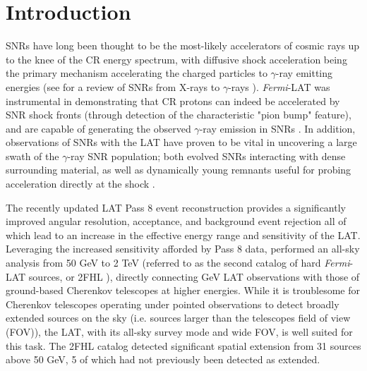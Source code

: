 \documentclass[iop]{emulateapj}
\newcommand{\kibitz}[2]{\ifnum\Comments=1\textcolor{#1}{#2}\fi}
\newcommand{\jamie}[1]{\kibitz{red}      {[JAM: #1]}}
\newcommand{\gam}{$\gamma$-ray}
\newcommand{\Fermi}{\emph{Fermi}}  %
\begin{document}
\section{Introduction}\label{G150:intro}
SNRs have long been thought to be the most-likely accelerators of cosmic rays up to the knee of the CR energy spectrum, with diffusive shock acceleration being the primary mechanism accelerating the charged particles to \gam{} emitting energies (see \cite{Reynolds08} for a review of  SNRs from X-rays to \gam{}s ). \Fermi{}-LAT was instrumental in demonstrating that CR protons can indeed be accelerated by SNR shock fronts (through detection of the characteristic "pion bump" feature), and are capable of generating the observed \gam{} emission in SNRs \citep{W44pion, Jogler16}. In addition, observations of SNRs with the LAT have proven to be vital in uncovering a large swath of the \gam{} SNR population; both evolved SNRs interacting with dense surrounding material, as well as dynamically young remnants useful for probing acceleration directly at the shock \citep{snrCat}. 

The  recently updated LAT Pass 8 event reconstruction provides a significantly improved angular resolution,  acceptance, and background event rejection \citep{atwood13b,atwood13} %
all of which lead to an increase in the effective energy range and sensitivity of the LAT. Leveraging the increased sensitivity afforded by Pass 8 data, \cite{2FHL} performed an all-sky analysis from 50 GeV to 2 TeV (referred to as the second catalog of hard \Fermi{}-LAT sources, or 2FHL%
), directly connecting GeV LAT observations  with those of ground-based Cherenkov telescopes at higher energies. While it is troublesome for Cherenkov telescopes operating under pointed observations to detect broadly extended sources on the sky (i.e. sources larger than the telescopes field of view (FOV)), the LAT, with its all-sky survey mode and wide FOV, is well suited for this task. The 2FHL catalog detected significant spatial extension from 31 sources above 50 GeV, 5 of which had not previously been detected as extended.
\end{document}
